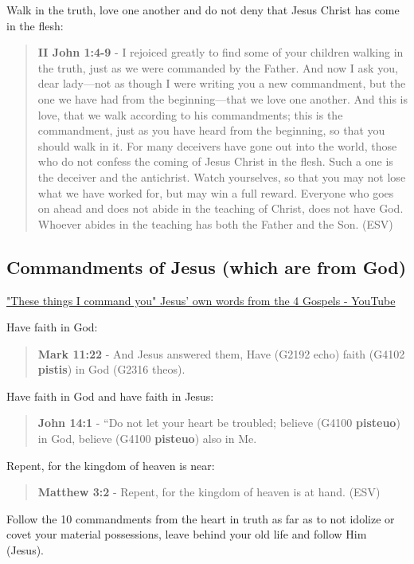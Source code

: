 \documentclass[11pt]{article}
\begin{document}
Walk in the truth, love one another and do not deny that Jesus Christ has come in the flesh:

\begin{quote}
\textbf{II John 1:4-9} - I rejoiced greatly to find some of your children walking in the truth, just as we were commanded by the Father. And now I ask you, dear lady—not as though I were writing you a new commandment, but the one we have had from the beginning—that we love one another. And this is love, that we walk according to his commandments; this is the commandment, just as you have heard from the beginning, so that you should walk in it. For many deceivers have gone out into the world, those who do not confess the coming of Jesus Christ in the flesh. Such a one is the deceiver and the antichrist. Watch yourselves, so that you may not lose what we have worked for, but may win a full reward. Everyone who goes on ahead and does not abide in the teaching of Christ, does not have God. Whoever abides in the teaching has both the Father and the Son. (ESV)
\end{quote}

\subsection{Commandments of Jesus (which are from God)}
\label{sec:orgf8f7525}
\href{https://www.youtube.com/watch?v=C7hdUorDU-U}{"These things I command you" Jesus' own words from the 4 Gospels - YouTube}

Have faith in God:

\begin{quote}
\textbf{Mark 11:22} - And Jesus answered them, Have (G2192 echo) faith (G4102 \textbf{pistis}) in God (G2316 theos).
\end{quote}

Have faith in God and have faith in Jesus:

\begin{quote}
\textbf{John 14:1} - “Do not let your heart be troubled; believe (G4100 \textbf{pisteuo}) in God, believe (G4100 \textbf{pisteuo}) also in Me.
\end{quote}

Repent, for the kingdom of heaven is near:

\begin{quote}
\textbf{Matthew 3:2} - Repent, for the kingdom of heaven is at hand. (ESV)
\end{quote}

Follow the 10 commandments from the heart in truth as far as to not idolize or covet your material possessions, leave behind your old life and follow Him (Jesus). 
\end{document}
